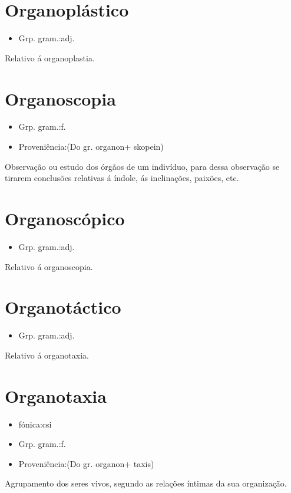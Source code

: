 \section{Organoplástico}
\begin{itemize}
\item {Grp. gram.:adj.}
\end{itemize}
Relativo á organoplastia.
\section{Organoscopia}
\begin{itemize}
\item {Grp. gram.:f.}
\end{itemize}
\begin{itemize}
\item {Proveniência:(Do gr. \textunderscore organon\textunderscore  + \textunderscore skopein\textunderscore )}
\end{itemize}
Observação ou estudo dos órgãos de um indivíduo, para dessa observação se tirarem conclusões relativas á índole, ás inclinações, paixões, etc.
\section{Organoscópico}
\begin{itemize}
\item {Grp. gram.:adj.}
\end{itemize}
Relativo á organoscopia.
\section{Organotáctico}
\begin{itemize}
\item {Grp. gram.:adj.}
\end{itemize}
Relativo á organotaxia.
\section{Organotaxia}
\begin{itemize}
\item {fónica:csi}
\end{itemize}
\begin{itemize}
\item {Grp. gram.:f.}
\end{itemize}
\begin{itemize}
\item {Proveniência:(Do gr. \textunderscore organon\textunderscore  + \textunderscore taxis\textunderscore )}
\end{itemize}
Agrupamento dos seres vivos, segundo as relações íntimas da sua organização.
